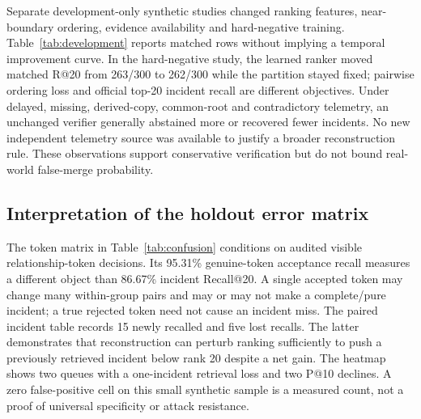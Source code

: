 Separate development-only synthetic studies changed ranking features, near-boundary ordering, evidence availability and hard-negative training. Table~\ref{tab:development} reports matched rows without implying a temporal improvement curve. In the hard-negative study, the learned ranker moved matched R@20 from 263/300 to 262/300 while the partition stayed fixed; pairwise ordering loss and official top-20 incident recall are different objectives. Under delayed, missing, derived-copy, common-root and contradictory telemetry, an unchanged verifier generally abstained more or recovered fewer incidents. No new independent telemetry source was available to justify a broader reconstruction rule. These observations support conservative verification but do not bound real-world false-merge probability.

\subsection{Interpretation of the holdout error matrix}
The token matrix in Table~\ref{tab:confusion} conditions on audited visible relationship-token decisions. Its 95.31\% genuine-token acceptance recall measures a different object than 86.67\% incident Recall@20. A single accepted token may change many within-group pairs and may or may not make a complete/pure incident; a true rejected token need not cause an incident miss. The paired incident table records 15 newly recalled and five lost recalls. The latter demonstrates that reconstruction can perturb ranking sufficiently to push a previously retrieved incident below rank 20 despite a net gain. The heatmap shows two queues with a one-incident retrieval loss and two P@10 declines. A zero false-positive cell on this small synthetic sample is a measured count, not a proof of universal specificity or attack resistance.
